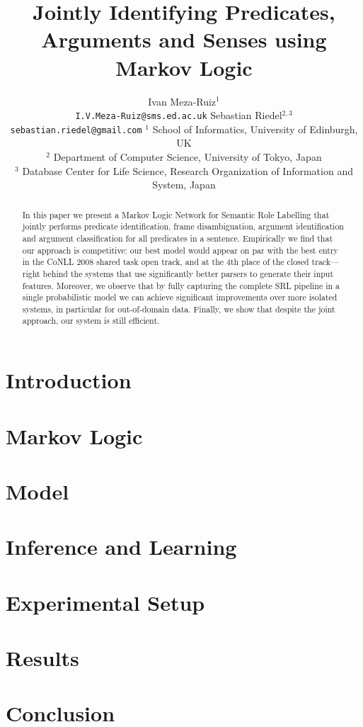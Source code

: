 \documentclass[11pt]{article}
\title{Jointly Identifying Predicates, Arguments and Senses using Markov Logic}
\author{
Ivan Meza-Ruiz$^{1}$ \\ {\tt I.V.Meza-Ruiz@sms.ed.ac.uk} \And Sebastian Riedel$^{2,3}$ \\ {\tt sebastian.riedel@gmail.com} \AND
${^1}$ {School of Informatics, University of Edinburgh, UK}\\
${^2}$ {Department of Computer Science, University of Tokyo, Japan}\\
${^3}$ {Database Center for Life Science, Research Organization of Information and System, Japan}\\
}
\begin{document}

\maketitle

\begin{abstract}
In this paper we present a Markov Logic Network for Semantic Role
Labelling that jointly performs predicate identification, frame
disambiguation, argument identification and argument classification
for all predicates in a sentence. Empirically we find that our
approach is competitive: our best model would appear on par
with the best entry in the CoNLL 2008 shared task open track, and at
the 4th place of the closed track---right behind the systems that use
significantly better parsers to generate their input features.
Moreover, we observe
that by fully capturing the complete SRL pipeline in a single
probabilistic model we can achieve significant improvements over more isolated systems, in particular for out-of-domain
data. Finally, we show that despite the joint approach, our
system is still efficient. 
\end{abstract} 


\section{Introduction}




\section{Markov Logic} \label{sec:markovlogic}



\section{Model} \label{sec:model} 



\section{Inference and Learning}\label{sec:inference}




\section{Experimental Setup}
\label{sec:experiments}


\section{Results}\label{sec:results}



\section{Conclusion} \label{sec:conclusion}





\end{document}
